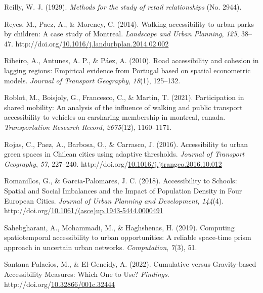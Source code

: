 \documentclass[
11pt, %
oneside, %
english, %
singlespacing, %
]{macthesis} %
\newlength{\cslhangindent}
\newenvironment{CSLReferences}[2] %
{\begin{list}{}{%
	\setlength{\itemindent}{0pt}
	\setlength{\leftmargin}{0pt}
	\setlength{\parsep}{0pt}
	\ifodd #1
	\setlength{\leftmargin}{\cslhangindent}
	\setlength{\itemindent}{-1\cslhangindent}
	\fi
	\setlength{\itemsep}{#2\baselineskip}}}
{\end{list}}
\begin{document}
\begin{CSLReferences}{1}{0}
Reilly, W. J. (1929). \emph{Methods for the study of retail relationships} (No. 2944).

Reyes, M., Paez, A., \& Morency, C. (2014). Walking accessibility to urban parks by children: {A} case study of {Montreal}. \emph{Landscape and Urban Planning}, \emph{125}, 38--47. http://doi.org/\href{https://doi.org/10.1016/j.landurbplan.2014.02.002}{10.1016/j.landurbplan.2014.02.002}

Ribeiro, A., Antunes, A. P., \& Páez, A. (2010). Road accessibility and cohesion in lagging regions: {Empirical} evidence from {Portugal} based on spatial econometric models. \emph{Journal of Transport Geography}, \emph{18}(1), 125--132.

Roblot, M., Boisjoly, G., Francesco, C., \& Martin, T. (2021). Participation in shared mobility: An analysis of the influence of walking and public transport accessibility to vehicles on carsharing membership in montreal, canada. \emph{Transportation Research Record}, \emph{2675}(12), 1160--1171.

Rojas, C., Paez, A., Barbosa, O., \& Carrasco, J. (2016). Accessibility to urban green spaces in {Chilean} cities using adaptive thresholds. \emph{Journal of Transport Geography}, \emph{57}, 227--240. http://doi.org/\href{https://doi.org/10.1016/j.jtrangeo.2016.10.012}{10.1016/j.jtrangeo.2016.10.012}

Romanillos, G., \& Garcia-Palomares, J. C. (2018). Accessibility to {Schools}: {Spatial} and {Social} {Imbalances} and the {Impact} of {Population} {Density} in {Four} {European} {Cities}. \emph{Journal of Urban Planning and Development}, \emph{144}(4). http://doi.org/\href{https://doi.org/10.1061/(asce)up.1943-5444.0000491}{10.1061/(asce)up.1943-5444.0000491}

Sahebgharani, A., Mohammadi, M., \& Haghshenas, H. (2019). Computing spatiotemporal accessibility to urban opportunities: A reliable space-time prism approach in uncertain urban networks. \emph{Computation}, \emph{7}(3), 51.

Santana Palacios, M., \& El-Geneidy, A. (2022). Cumulative versus Gravity-based Accessibility Measures: Which One to Use? \emph{Findings}. http://doi.org/\href{https://doi.org/10.32866/001c.32444}{10.32866/001c.32444}


\end{CSLReferences}
\end{document}
